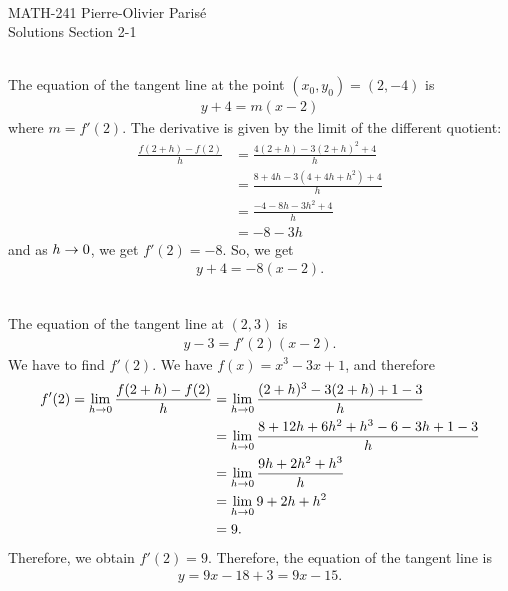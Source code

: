 


	\noindent \hrulefill \\
	MATH-241 \hfill Pierre-Olivier Paris{\'e}\\
	Solutions Section 2-1 \hfill \semester \\\vspace*{-1cm}
	
	\noindent\hrulefill
	
	\spc
	
	\\
	The equation of the tangent line at the point $(x_0 , y_0 ) = (2, -4)$ is
		\begin{align*}
		y + 4 = m (x - 2)
		\end{align*}
	where $m = f'(2)$. The derivative is given by the limit of the different quotient:
		\begin{align*}
		\frac{f (2 + h) - f(2)}{h} & = \frac{4(2 + h) - 3(2 + h)^2 + 4}{h} \\
		&= \frac{8 + 4h - 3(4 + 4h + h^2) + 4}{h} \\
		&= \frac{-4 - 8h - 3h^2 + 4}{h} \\
		&= -8 - 3h
		\end{align*}
	and as $h \rightarrow 0$, we get $f'(2) = -8$. So, we get
		\begin{align*}
		y + 4 = -8 (x - 2) .
		\end{align*}
		
	\spc
	
	\\
	The equation of the tangent line at $(2, 3)$ is 
		\begin{align*}
		y - 3 = f'(2) (x - 2) .
		\end{align*}
	We have to find $f'(2)$. We have $f(x) = x^3 - 3x + 1$, and therefore
		\begin{align*}
		f' (2) = \lim_{h \rightarrow 0} \frac{f (2 + h) - f(2)}{h} &= \lim_{h \rightarrow 0} \frac{ (2 + h)^3 - 3(2 + h) + 1 - 3}{h} \\
		&= \lim_{h \rightarrow 0} \frac{8 + 12h + 6h^2 + h^3 - 6 - 3h + 1 - 3}{h} \\
		&= \lim_{h \rightarrow 0} \frac{9h + 2h^2 + h^3}{h} \\
		&= \lim_{h \rightarrow 0} 9 + 2h + h^2 \\
		&= 9 .
		\end{align*}
	Therefore, we obtain $f' (2) = 9$. Therefore, the equation of the tangent line is	
		\begin{align*}
		y = 9x - 18 + 3 = 9x - 15 .
		\end{align*}
	
